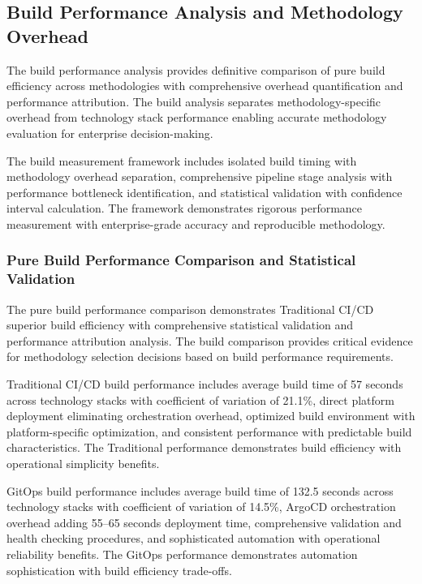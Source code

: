 
\subsection{Build Performance Analysis and Methodology Overhead}
\label{subsec:build_performance}

The build performance analysis provides definitive comparison of pure build efficiency across methodologies with comprehensive overhead quantification and performance attribution. The build analysis separates methodology-specific overhead from technology stack performance enabling accurate methodology evaluation for enterprise decision-making.

The build measurement framework includes isolated build timing with methodology overhead separation, comprehensive pipeline stage analysis with performance bottleneck identification, and statistical validation with confidence interval calculation. The framework demonstrates rigorous performance measurement with enterprise-grade accuracy and reproducible methodology.

\subsubsection{Pure Build Performance Comparison and Statistical Validation}

The pure build performance comparison demonstrates Traditional CI/CD superior build efficiency with comprehensive statistical validation and performance attribution analysis. The build comparison provides critical evidence for methodology selection decisions based on build performance requirements.

Traditional CI/CD build performance includes average build time of 57 seconds across technology stacks with coefficient of variation of 21.1\%, direct platform deployment eliminating orchestration overhead, optimized build environment with platform-specific optimization, and consistent performance with predictable build characteristics. The Traditional performance demonstrates build efficiency with operational simplicity benefits.

GitOps build performance includes average build time of 132.5 seconds across technology stacks with coefficient of variation of 14.5\%, ArgoCD orchestration overhead adding 55--65 seconds deployment time, comprehensive validation and health checking procedures, and sophisticated automation with operational reliability benefits. The GitOps performance demonstrates automation sophistication with build efficiency trade-offs.

